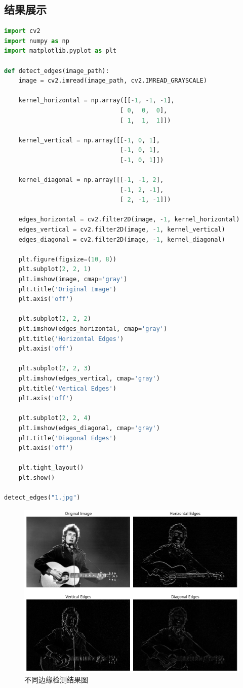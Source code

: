 \documentclass[a4paper,12pt]{article}
\begin{document}
\subsection{结果展示}
\begin{lstlisting}[language=Python]
import cv2
import numpy as np
import matplotlib.pyplot as plt

def detect_edges(image_path):
	image = cv2.imread(image_path, cv2.IMREAD_GRAYSCALE)

	kernel_horizontal = np.array([[-1, -1, -1],
								[ 0,  0,  0],
								[ 1,  1,  1]])

	kernel_vertical = np.array([[-1, 0, 1],
								[-1, 0, 1],
								[-1, 0, 1]])

	kernel_diagonal = np.array([[-1, -1, 2],
								[-1, 2, -1],
								[ 2, -1, -1]])

	edges_horizontal = cv2.filter2D(image, -1, kernel_horizontal)
	edges_vertical = cv2.filter2D(image, -1, kernel_vertical)
	edges_diagonal = cv2.filter2D(image, -1, kernel_diagonal)

	plt.figure(figsize=(10, 8))
	plt.subplot(2, 2, 1)
	plt.imshow(image, cmap='gray')
	plt.title('Original Image')
	plt.axis('off')

	plt.subplot(2, 2, 2)
	plt.imshow(edges_horizontal, cmap='gray')
	plt.title('Horizontal Edges')
	plt.axis('off')

	plt.subplot(2, 2, 3)
	plt.imshow(edges_vertical, cmap='gray')
	plt.title('Vertical Edges')
	plt.axis('off')

	plt.subplot(2, 2, 4)
	plt.imshow(edges_diagonal, cmap='gray')
	plt.title('Diagonal Edges')
	plt.axis('off')

	plt.tight_layout()
	plt.show()

detect_edges("1.jpg")
\end{lstlisting}
\begin{figure}[htbp]
	\centering
	\includegraphics[width=1\textwidth]{8.png}
	\caption{不同边缘检测结果图}
\end{figure}
\end{document}
